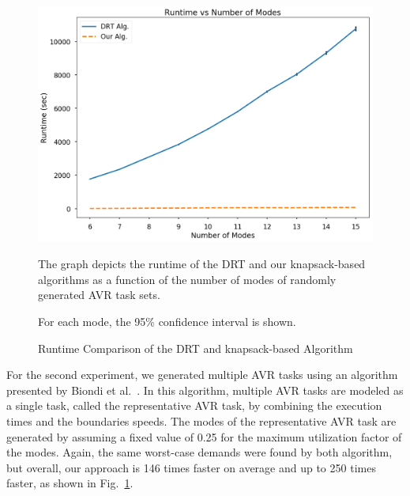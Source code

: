 \begin{figure}[h]
\centering
\includegraphics[width=1.0\linewidth]{fig/runtimePlot-confidence_intervals.png}
\caption{Runtime Comparison of the DRT and knapsack-based Algorithm} The graph depicts the runtime of the DRT and our knapsack-based algorithms as a function of the number of modes of randomly generated AVR task sets.

For each mode, the 95\% confidence interval is shown.
\label{fig:finalgraph}
\end{figure}

For the second experiment, we generated multiple AVR tasks using an algorithm presented by Biondi et al.~\cite{biondi_response-time_2015}. In this algorithm, multiple AVR tasks are modeled as a single task, called the representative AVR task, by combining the execution times and the boundaries speeds. The modes of the representative AVR task are generated by assuming a fixed value of 0.25 for the maximum utilization factor of the modes. Again, the same worst-case demands were found by both algorithm, but overall, our approach is 146 times faster on average and up to 250 times faster, as shown in Fig.~\ref{fig:finalgraph}.


